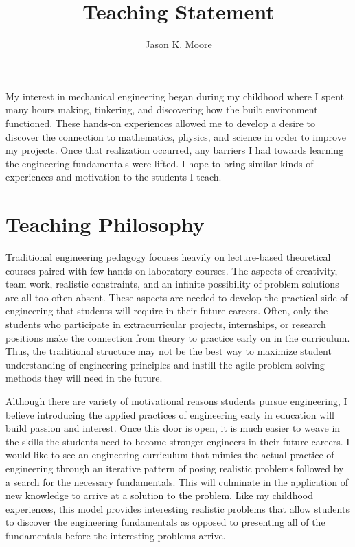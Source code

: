 \documentclass{article}
\title{Teaching Statement}
\author{Jason K. Moore}
\date{}
\begin{document}
\maketitle

My interest in mechanical engineering began during my childhood where I spent
many hours making, tinkering, and discovering how the built environment
functioned. These hands-on experiences allowed me to develop a desire to
discover the connection to mathematics, physics, and science in order to
improve my projects. Once that realization occurred, any barriers I had towards
learning the engineering fundamentals were lifted. I hope to bring similar
kinds of experiences and motivation to the students I teach.

\section*{Teaching Philosophy}
%
Traditional engineering pedagogy focuses heavily on lecture-based theoretical
courses paired with few hands-on laboratory courses. The aspects of creativity,
team work, realistic constraints, and an infinite possibility of problem
solutions are all too often absent. These aspects are needed to develop the
practical side of engineering that students will require in their future
careers. Often, only the students who participate in extracurricular projects,
internships, or research positions make the connection from theory to practice
early on in the curriculum. Thus, the traditional structure may not be the best
way to maximize student understanding of engineering principles and instill the
agile problem solving methods they will need in the future.

Although there are variety of motivational reasons students pursue engineering,
I believe introducing the applied practices of engineering early in education
will build passion and interest. Once this door is open, it is much easier to
weave in the skills the students need to become stronger engineers in their
future careers. I would like to see an engineering curriculum that mimics the
actual practice of engineering through an iterative pattern of posing realistic
problems followed by a search for the necessary fundamentals. This will
culminate in the application of new knowledge to arrive at a solution to the
problem. Like my childhood experiences, this model provides interesting
realistic problems that allow students to discover the engineering fundamentals
as opposed to presenting all of the fundamentals before the interesting
problems arrive.
\end{document}
